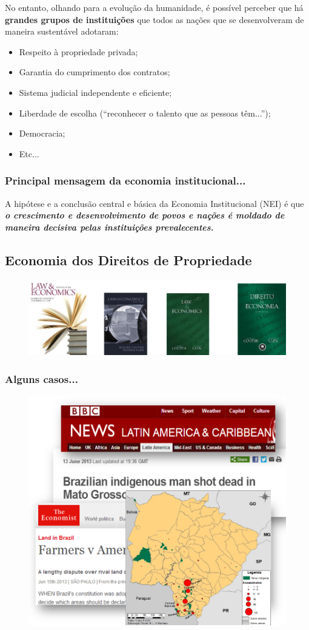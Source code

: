 \documentclass[a4paper,12pt]{article}[abntex2]
\begin{document}
No entanto, olhando para a evolução da humanidade, é possível perceber que há \textbf{grandes grupos de instituições} que todos as nações que se desenvolveram de maneira sustentável adotaram:\begin{itemize}
    \item Respeito à propriedade privada;
    \item Garantia do cumprimento dos contratos;
    \item Sistema judicial independente e eficiente;
    \item Liberdade de escolha (“reconhecer o talento que as pessoas têm...”);
    \item Democracia;
    \item Etc... 
\end{itemize}

\subsubsection{\textbf{Principal mensagem da economia institucional... }}

A hipótese e a conclusão central e básica da Economia Institucional (NEI) é que \textit{\textbf{o crescimento e desenvolvimento de povos e nações é moldado de maneira decisiva pelas instituições prevalecentes.}}

\subsection{\textbf{Economia dos Direitos de Propriedade}}
\begin{figure}[H]
    \centering
    \includegraphics[width=0.5\linewidth]{Imagens/a4i1.png}
\end{figure}

\subsubsection{\textbf{Alguns casos...}}
\begin{figure}[H]
    \centering
    \includegraphics[width=0.5\linewidth]{Imagens/a4i2.png}
\end{figure}
\end{document}
